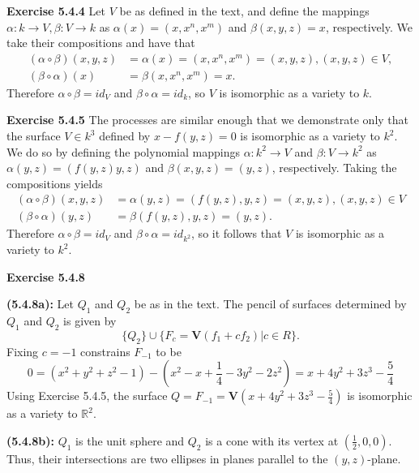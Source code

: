 \documentclass[12pt,oneside]{article}
\newenvironment{exercise}[1]{\vspace{.1in}\noindent\textbf{Exercise #1 \hspace{.05em}}}{}
\newcommand{\R}{\mathbb{R}}
\begin{document}

\begin{exercise}{5.4.4}
    Let $V$ be as defined in the text, and define the mappings 
    $\alpha:k\to V, \beta:V\to k$ as $\alpha(x)=(x,x^n,x^m)$ and 
    $\beta(x,y,z)=x$, respectively. We take their compositions and
    have that 
    \begin{align*}
        (\alpha \circ \beta)(x,y,z)&=\alpha(x)=(x,x^n,x^m)=(x,y,z), (x,y,z)\in V,\\
        (\beta \circ \alpha)(x) &= \beta(x,x^n,x^m)=x.
    \end{align*}
    Therefore $\alpha \circ \beta = id_V$ and $\beta \circ \alpha = id_k$,
    so $V$ is isomorphic as a variety to $k$.
\end{exercise}


\begin{exercise}{5.4.5}
    The processes are similar enough that we demonstrate only 
    that the surface $V \in k^3$ defined by $x-f(y,z)=0$ is 
    isomorphic as a variety to $k^2$. We do so by defining the 
    polynomial mappings $\alpha:k^2\to V$ and $\beta:V\to k^2$ 
    as $\alpha(y,z)=(f(y,z)y,z)$ and $\beta(x,y,z)=(y,z)$, respectively.
    Taking the compositions yields
    \begin{align*}
        (\alpha \circ \beta)(x,y,z) &= \alpha(y,z)=(f(y,z),y,z)=(x,y,z), (x,y,z)\in V\\
        (\beta \circ \alpha)(y,z) &= \beta(f(y,z),y,z)=(y,z).
    \end{align*}
    Therefore $\alpha \circ \beta = id_V$ and $\beta \circ \alpha = id_{k^2}$,
    so it follows that $V$ is isomorphic as a variety to $k^2$.
\end{exercise}


\begin{exercise}{5.4.8}
    
    \bigskip
    \textbf{(5.4.8a):}
    Let $Q_1$ and $Q_2$ be as in the text. The pencil of surfaces 
    determined by $Q_1$ and $Q_2$ is given by 
    \[
        \{Q_2\}\cup\{F_c=\mathbf{V}(f_1+cf_2)\vert c\in R\}.    
    \]
    Fixing $c=-1$ constrains $F_{-1}$ to be 
    \[
        0=(x^2+y^2+z^2-1)-(x^2-x+\frac{1}{4}-3y^2-2z^2) = x+4y^2+3z^3-\frac{5}{4}   
    \]
    Using Exercise 5.4.5, the surface $Q=F_{-1}=\mathbf{V}(x+4y^2+3z^3-\frac{5}{4})$
    is isomorphic as a variety to $\R^2$.
    
    \bigskip
    \textbf{(5.4.8b):}
    $Q_1$ is the unit sphere and $Q_2$ is a cone with its vertex 
    at $(\frac{1}{2},0,0)$. Thus, their intersections are two 
    ellipses in planes parallel to the $(y,z)$-plane.

\end{exercise}
\end{document}
